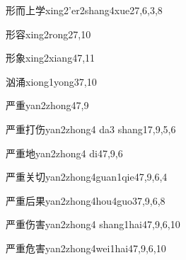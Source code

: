 \begin{verbete}{形而上学}{xing2'er2shang4xue2}{7,6,3,8}
\end{verbete}

\begin{verbete}{形容}{xing2rong2}{7,10}
\end{verbete}

\begin{verbete}{形象}{xing2xiang4}{7,11}
\end{verbete}

\begin{verbete}{汹涌}{xiong1yong3}{7,10}
\end{verbete}

\begin{verbete}{严重}{yan2zhong4}{7,9}
\end{verbete}

\begin{verbete}{严重打伤}{yan2zhong4 da3 shang1}{7,9,5,6}
\end{verbete}

\begin{verbete}{严重地}{yan2zhong4 di4}{7,9,6}
\end{verbete}

\begin{verbete}{严重关切}{yan2zhong4guan1qie4}{7,9,6,4}
\end{verbete}

\begin{verbete}{严重后果}{yan2zhong4hou4guo3}{7,9,6,8}
\end{verbete}

\begin{verbete}{严重伤害}{yan2zhong4 shang1hai4}{7,9,6,10}
\end{verbete}

\begin{verbete}{严重危害}{yan2zhong4wei1hai4}{7,9,6,10}
\end{verbete}

